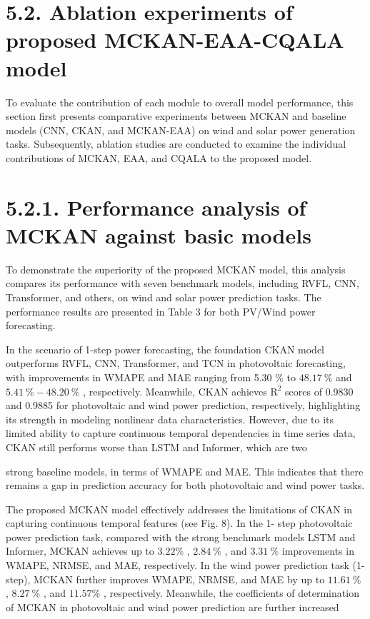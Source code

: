 \documentclass[
  10
]{article}
\begin{document}
\section{5.2. Ablation experiments of proposed MCKAN-EAA-CQALA
model}\label{ablation-experiments-of-proposed-mckan-eaa-cqala-model}

To evaluate the contribution of each module to overall model
performance, this section first presents comparative experiments between
MCKAN and baseline models (CNN, CKAN, and MCKAN-EAA) on wind and solar
power generation tasks. Subsequently, ablation studies are conducted to
examine the individual contributions of MCKAN, EAA, and CQALA to the
proposed model.

\section{5.2.1. Performance analysis of MCKAN against basic
models}\label{performance-analysis-of-mckan-against-basic-models}

To demonstrate the superiority of the proposed MCKAN model, this
analysis compares its performance with seven benchmark models, including
RVFL, CNN, Transformer, and others, on wind and solar power prediction
tasks. The performance results are presented in Table 3 for both PV/Wind
power forecasting.

In the scenario of 1-step power forecasting, the foundation CKAN model
outperforms RVFL, CNN, Transformer, and TCN in photovoltaic forecasting,
with improvements in WMAPE and MAE ranging from 5.30 \(\%\) to
\(4 8 . 1 7 ~ \%\) and \(5 . 4 1 \ \% - 4 8 . 2 0 \ \%\) , respectively.
Meanwhile, CKAN achieves \(\mathrm { R } ^ { 2 }\) scores of 0.9830 and
0.9885 for photovoltaic and wind power prediction, respectively,
highlighting its strength in modeling nonlinear data characteristics.
However, due to its limited ability to capture continuous temporal
dependencies in time series data, CKAN still performs worse than LSTM
and Informer, which are two

strong baseline models, in terms of WMAPE and MAE. This indicates that
there remains a gap in prediction accuracy for both photovoltaic and
wind power tasks.

The proposed MCKAN model effectively addresses the limitations of CKAN
in capturing continuous temporal features (see Fig. 8). In the 1- step
photovoltaic power prediction task, compared with the strong benchmark
models LSTM and Informer, MCKAN achieves up to \(3 . 2 2 \%\) ,
\(2 . 8 4 ~ \%\) , and \(3 . 3 1 ~ \%\) improvements in WMAPE, NRMSE,
and MAE, respectively. In the wind power prediction task (1-step), MCKAN
further improves WMAPE, NRMSE, and MAE by up to \(1 1 . 6 1 ~ \%\) ,
\(8 . 2 7 ~ \%\) , and \(1 1 . 5 7 \%\) , respectively. Meanwhile, the
coefficients of determination of MCKAN in photovoltaic and wind power
prediction are further increased
\end{document}
